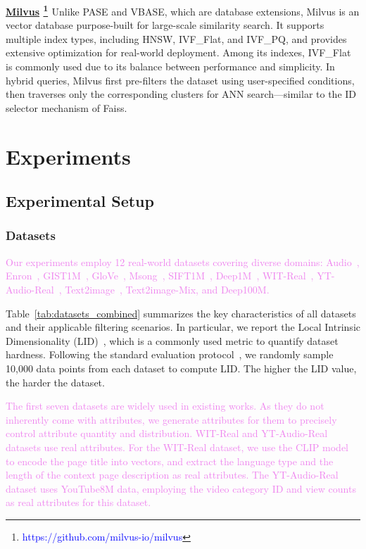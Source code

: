 \documentclass[sigconf, nonacm]{acmart}
\begin{document}
{	\noindent\textbf{\underline{Milvus} \footnote{\textcolor{blue}{https://github.com/milvus-io/milvus}} \cite{milvus}}
	Unlike PASE and VBASE, which are database extensions, Milvus is an vector database purpose-built for large-scale similarity search. It supports multiple index types, including HNSW, IVF\_Flat, and IVF\_PQ, and provides extensive optimization for real-world deployment. Among its indexes, IVF\_Flat is commonly used due to its balance between performance and simplicity. In hybrid queries, Milvus first pre-filters the dataset using user-specified conditions, then traverses only the corresponding clusters for ANN search—similar to the ID selector mechanism of Faiss.
	
	\section{Experiments}
	\subsection{Experimental Setup}
	\subsubsection{Datasets}
	
	\textcolor{violet}{Our experiments employ 12 real-world datasets covering diverse domains: Audio~\cite{audio_unknown},  Enron~\cite{enron2015}, GIST1M~\cite{sift2010}, GloVe~\cite{GloVe2015}, Msong~\cite{msong2011}, SIFT1M~\cite{sift2010}, Deep1M~\cite{yandex_deep_dataset}, WIT-Real~\cite{wit_dataset}, YT-Audio-Real~\cite{youtube8m_dataset}, Text2image~\cite{texttoimage}, Text2image-Mix, and Deep100M.}
	
	Table~\ref{tab:datasets_combined} summarizes the key characteristics of all datasets and their applicable filtering scenarios. In particular, we report the Local Intrinsic Dimensionality (LID)~\cite{Lid}, which is a commonly used metric to quantify dataset hardness. Following the standard evaluation protocol~\cite{LID2}, we randomly sample 10,000 data points from each dataset to compute LID. The higher the LID value, the harder the dataset.
	
	\textcolor{violet}{The first seven datasets are widely used in existing works. As they do not inherently come with attributes, we generate attributes for them to precisely control attribute quantity and distribution. WIT-Real and YT-Audio-Real datasets use real attributes. For the WIT-Real dataset, we use the CLIP model to encode the page title into vectors, and extract the language type and the length of the context page description  as real attributes. The YT-Audio-Real dataset uses YouTube8M data, employing the video category ID and view counts as real attributes for this dataset.}
	
}
\end{document}
